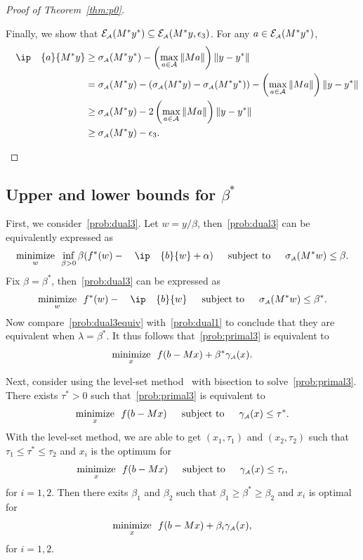 \begin{proof}[Proof of Theorem~\ref{thm:p0}]
\begin{itemize}
      Finally, we show that $\mathcal{E}_{\scriptscriptstyle\mathcal{A}}(M^*y^*) \subseteq \mathcal{E}_{\scriptscriptstyle\mathcal{A}}(M^*y, \epsilon_3)$. For any $a \in \mathcal{E}_{\scriptscriptstyle\mathcal{A}}(M^*y^*)$, 
      \begin{align*}
        \ip{a}{M^*y} &\geq \sigma\As(M^*y^*) - \left(\max\limits_{a \in \Ascr}\|Ma\|\right)\|y - y^*\|
        \\&= \sigma\As(M^*y) - \left(\sigma\As(M^*y) - \sigma\As(M^*y^*)\right) - \left(\max\limits_{a \in \Ascr}\|Ma\|\right)\|y - y^*\|
        \\&\geq \sigma\As(M^*y) - 2\left(\max\limits_{a \in \Ascr}\|Ma\|\right)\|y - y^*\|
        \\&\geq \sigma\As(M^*y) - \epsilon_3.
      \end{align*}
    \end{itemize}
\end{proof}


\subsection{Upper and lower bounds for \texorpdfstring{$\beta^*$}{} }
\label{app:bounds}
First, we consider~\eqref{prob:dual3}. Let $w = y/\beta$, then~\eqref{prob:dual3} can be equivalently expressed as 
\[\minimize{w} \inf_{\beta>0} \beta(f^*(w) - \ip{b}{w} + \alpha) \enspace\text{subject to}\enspace \sigma\As(M^* w) \leq \beta.\]
Fix $\beta = \beta^*$, then~\eqref{prob:dual3} can be expressed as 
\begin{equation} \label{prob:dual3equiv}
  \minimize{w} f^*(w) - \ip{b}{w} \enspace\text{subject to}\enspace \sigma\As(M^* w) \leq \beta^*.
\end{equation}
Now compare~\eqref{prob:dual3equiv} with~\eqref{prob:dual1} to conclude that they are equivalent when $\lambda = \beta^*$. It thus follows that~\eqref{prob:primal3} is equivalent to  
\begin{equation} \label{prob:p1beta}
    \displaystyle\mathop{\hbox{\rm minimize}}_{x}\enspace f(b - Mx) + \beta^*\gamma_{\scriptscriptstyle\mathcal{A}}(x). 
\end{equation}   

Next, consider using the level-set method~\cite{aravkin2016levelset} with bisection to solve~\eqref{prob:primal3}. There exists $\tau^* > 0$ such that~\eqref{prob:primal3} is equivalent to
\begin{equation} \label{prob:p2tau}
    \displaystyle\mathop{\hbox{\rm minimize}}_{x}\enspace f(b - Mx) \enspace\hbox{\quad subject to\quad}\enspace \gamma_{\scriptscriptstyle\mathcal{A}}(x)\leq\tau^*. 
\end{equation}
With the level-set method, we are able to get $(x_1, \tau_1)$ and $(x_2, \tau_2)$ such that $\tau_1 \leq \tau^* \leq \tau_2$ and $x_i$ is the optimum for 
\begin{equation} \label{prob:p2taui}
    \displaystyle\mathop{\hbox{\rm minimize}}_{x}\enspace f(b - Mx) \enspace\hbox{\quad subject to\quad}\enspace \gamma_{\scriptscriptstyle\mathcal{A}}(x)\leq\tau_i, 
\end{equation}
for $i = 1, 2$. Then there exits $\beta_1$ and $\beta_2$ such that $\beta_1 \geq \beta^* \geq \beta_2$ and $x_i$ is optimal for 
\begin{equation} \label{prob:p1betai}
    \displaystyle\mathop{\hbox{\rm minimize}}_{x}\enspace f(b - Mx) + \beta_i\gamma_{\scriptscriptstyle\mathcal{A}}(x),
\end{equation}
for $i = 1, 2$.

